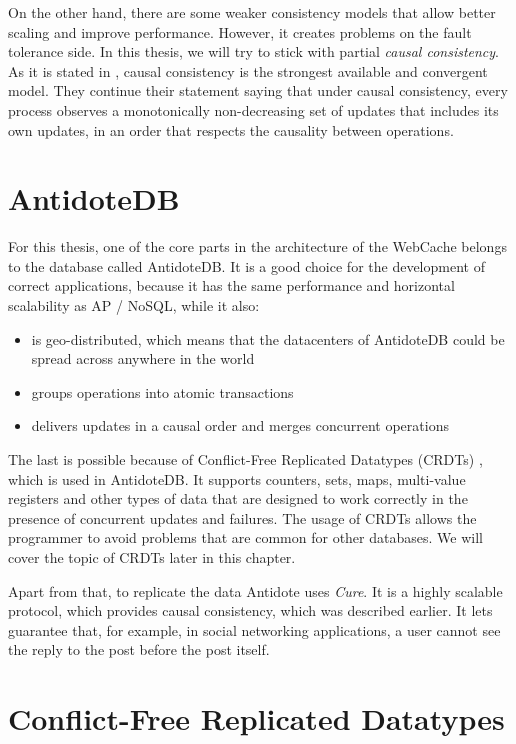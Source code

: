 On the other hand, there are some weaker consistency models that allow better scaling and improve performance. However, it creates problems on the fault tolerance side. In this thesis, we will try to stick with partial \textit{causal consistency}. As it is stated in \citet{7}, causal consistency is the strongest available and convergent model. They continue their statement saying that under causal consistency, every process observes a monotonically non-decreasing set of updates that includes its own updates, in an order that respects the causality between operations.

\section{AntidoteDB}

For this thesis, one of the core parts in the architecture of the WebCache belongs to the database called AntidoteDB\cite{4}. It is a good choice for the development of correct applications, because it has the same performance and horizontal scalability as AP / NoSQL\cite{14}, while it also:

\begin{itemize}
\item {is geo-distributed, which means that the datacenters of AntidoteDB could be spread across anywhere in the world}
\item {groups operations into atomic transactions\cite{9}}
\item {delivers updates in a causal order and merges concurrent operations}
\end{itemize} 

The last is possible because of Conflict-Free Replicated Datatypes (CRDTs) \cite{2}, which is used in AntidoteDB. It supports counters, sets, maps, multi-value registers and other types of data that are designed to work correctly in the presence of concurrent updates and failures. The usage of CRDTs allows the programmer to avoid problems that are common for other databases. We will cover the topic of CRDTs later in this chapter.

Apart from that, to replicate the data Antidote uses \textit{Cure}\cite{15}. It is a highly scalable protocol, which provides causal consistency, which was described earlier. It lets guarantee that, for example, in social networking applications, a user cannot see the reply to the post before the post itself.   

\section{Conflict-Free Replicated Datatypes}

